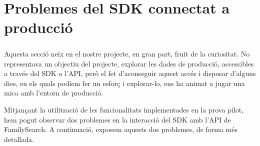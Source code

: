 \chapter{Problemes del SDK connectat a producció}

    \paragraph{}
    Aquesta secció neix en el nostre projecte, en gran part, fruit de la curiositat. No representava un objectiu del projecte, explorar les dades de producció, accessibles a través del SDK o l'API, però el fet d'aconseguir aquest accés i disposar d'alguns dies, en els quals podíem fer un esforç i explorar-lo, ens ha animat a jugar una mica amb l'entorn de producció.

    Mitjançant la utilització de les funcionalitats implementades en la prova pilot, hem pogut observar dos problemes en la interacció del SDK amb l'API de FamilySearch. A continuació, exposem aquests dos problemes, de forma més detallada.

    
    
